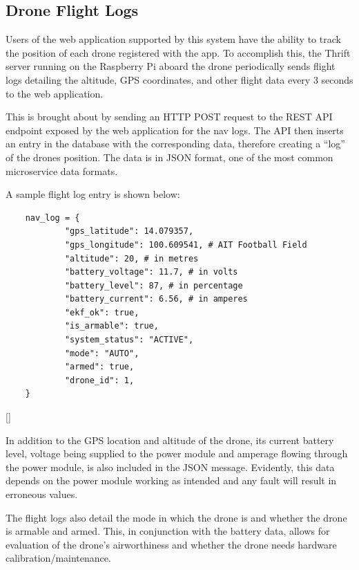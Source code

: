 \subsection{Drone Flight Logs}\label{subsect:flightstatus}
Users of the web application supported by this system have the ability to track the position of each drone registered with the app. To accomplish this, the Thrift server running on the Raspberry Pi aboard the drone periodically sends flight logs detailing the altitude, GPS coordinates, and other flight data every 3 seconds to the web application.

This is brought about by sending an HTTP POST request to the REST API endpoint exposed by the web application for the nav logs. The API then inserts an entry in the database with the corresponding data, therefore creating a “log” of the drone\textquotesingle s position. The data is in JSON format, one of the most common microservice data formats.

A sample flight log entry is shown below:
\begin{verbatim}
    nav_log = {
            "gps_latitude": 14.079357,
            "gps_longitude": 100.609541, # AIT Football Field
            "altitude": 20, # in metres
            "battery_voltage": 11.7, # in volts
            "battery_level": 87, # in percentage
            "battery_current": 6.56, # in amperes
            "ekf_ok": true,
            "is_armable": true,
            "system_status": "ACTIVE",
            "mode": "AUTO",
            "armed": true,
            "drone_id": 1,
    }
\end{verbatim}[]


In addition to the GPS location and altitude of the drone, its current battery level, voltage being supplied to the power module and amperage flowing through the power module, is also included in the JSON message. Evidently, this data depends on the power module working as intended and any fault will result in erroneous values.

The flight logs also detail the mode in which the drone is and whether the drone is armable and armed. This, in conjunction with the battery data, allows for evaluation of the drone's airworthiness and whether the drone needs hardware calibration/maintenance.

